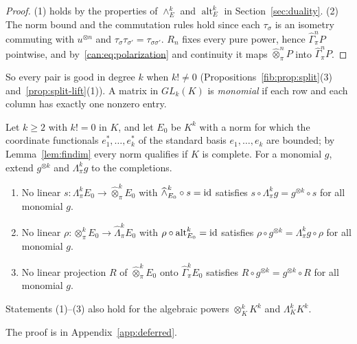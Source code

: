 \begin{proof}
(1) holds by the properties of $\wedge^k_E$ and $\operatorname{alt}^k_E$ in Section~\ref{sec:duality}.
(2) The norm bound and the commutation rules hold since each $\tau_\sigma$ is an isometry commuting with $u^{\otimes n}$
and $\tau_\sigma\tau_{\sigma'}=\tau_{\sigma\sigma'}$. $R_n$ fixes every pure power, hence $\widehat\Gamma^n_\pi P$
pointwise, and by~\eqref{can:eq:polarization} and continuity it maps $\widehat\otimes^n_\pi P$ into
$\widehat\Gamma^n_\pi P$.
\end{proof}

So every pair is good in degree $k$ when $k!\ne0$ (Propositions~\ref{fib:prop:split}(3) and~\ref{prop:split-lift}(1)).
A matrix in $GL_k(K)$ is \emph{monomial} if each row and each column has exactly one nonzero entry.

\begin{theorem}\label{can:thm:monomial}
Let $k\ge2$ with $k!=0$ in $K$, and let $E_0$ be $K^k$ with a norm for which the coordinate functionals
$e^*_1,\dots,e^*_k$ of the standard basis $e_1,\dots,e_k$ are bounded; by Lemma~\ref{lem:findim} every norm
qualifies if $K$ is complete. For a monomial $g$, extend $g^{\otimes k}$ and $\Lambda^k_\pi g$ to the completions.
\begin{enumerate}
\item No linear $s\colon\Lambda^k_\pi E_0\to\widehat\otimes^k_\pi E_0$ with $\widehat\wedge^k_{E_0}\circ s=\mathrm{id}$ satisfies
$s\circ\Lambda^k_\pi g=g^{\otimes k}\circ s$ for all monomial $g$.
\item No linear $\rho\colon\otimes^k_\pi E_0\to\widehat\Lambda^k_\pi E_0$ with $\rho\circ\operatorname{alt}^k_{E_0}=\mathrm{id}$
satisfies $\rho\circ g^{\otimes k}=\Lambda^k_\pi g\circ\rho$ for all monomial $g$.
\item No linear projection $R$ of $\widehat\otimes^k_\pi E_0$ onto $\widehat\Gamma^k_\pi E_0$ satisfies
$R\circ g^{\otimes k}=g^{\otimes k}\circ R$ for all monomial $g$.
\end{enumerate}
Statements (1)--(3) also hold for the algebraic powers $\otimes^k_KK^k$ and $\Lambda^k_KK^k$.
\end{theorem}

The proof is in Appendix~\ref{app:deferred}.


